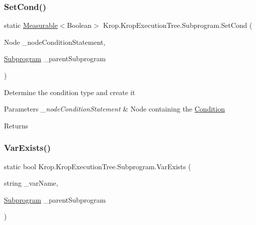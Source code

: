 \subsubsection{\texorpdfstring{Set\+Cond()}{SetCond()}}
{\footnotesize\ttfamily static \mbox{\hyperlink{class_krop_1_1_krop_execution_tree_1_1_abstract_class_1_1_measurable}{Measurable}}$<$Boolean$>$ Krop.\+Krop\+Execution\+Tree.\+Subprogram.\+Set\+Cond (\begin{DoxyParamCaption}\item[{Node}]{\+\_\+node\+Condition\+Statement,  }\item[{\mbox{\hyperlink{class_krop_1_1_krop_execution_tree_1_1_subprogram}{Subprogram}}}]{\+\_\+parent\+Subprogram }\end{DoxyParamCaption})\hspace{0.3cm}{\ttfamily [static]}}



Determine the condition type and create it 


\begin{DoxyParams}{Parameters}
{\em \+\_\+node\+Condition\+Statement} & Node containing the \mbox{\hyperlink{namespace_krop_1_1_krop_execution_tree_1_1_condition}{Condition}}\\
\hline
\end{DoxyParams}
\begin{DoxyReturn}{Returns}

\end{DoxyReturn}
\mbox{\label{class_krop_1_1_krop_execution_tree_1_1_subprogram_af4e885168e0d7bbde2cf26f9f98c7af4}} 
\subsubsection{\texorpdfstring{Var\+Exists()}{VarExists()}}
{\footnotesize\ttfamily static bool Krop.\+Krop\+Execution\+Tree.\+Subprogram.\+Var\+Exists (\begin{DoxyParamCaption}\item[{string}]{\+\_\+var\+Name,  }\item[{\mbox{\hyperlink{class_krop_1_1_krop_execution_tree_1_1_subprogram}{Subprogram}}}]{\+\_\+parent\+Subprogram }\end{DoxyParamCaption})\hspace{0.3cm}{\ttfamily [static]}}



